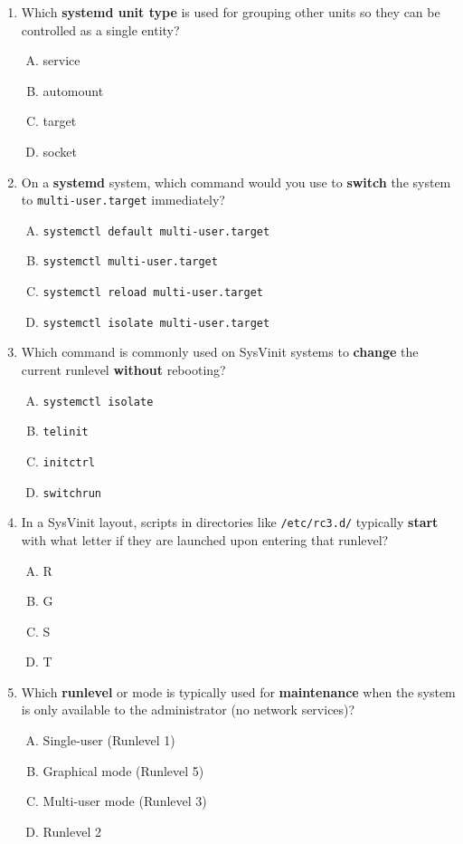 \documentclass[12pt,a4paper]{report}
\begin{document}
\begin{enumerate}[1.]
    \item Which \textbf{systemd unit type} is used for grouping other units so they can be controlled as a single entity?
    \begin{enumerate}[A)]
        \item service
        \item automount
        \item target
        \item socket
    \end{enumerate}
    
    \item On a \textbf{systemd} system, which command would you use to \textbf{switch} the system to \texttt{multi-user.target} immediately?
    \begin{enumerate}[A)]
        \item \texttt{systemctl default multi-user.target}
        \item \texttt{systemctl multi-user.target}
        \item \texttt{systemctl reload multi-user.target}
        \item \texttt{systemctl isolate multi-user.target}
    \end{enumerate}
    
    \item Which command is commonly used on SysVinit systems to \textbf{change} the current runlevel \textbf{without} rebooting?
    \begin{enumerate}[A)]
        \item \texttt{systemctl isolate}
        \item \texttt{telinit}
        \item \texttt{initctrl}
        \item \texttt{switchrun}
    \end{enumerate}
    
    \item In a SysVinit layout, scripts in directories like \texttt{/etc/rc3.d/} typically \textbf{start} with what letter if they are launched upon entering that runlevel?
    \begin{enumerate}[A)]
        \item R
        \item G
        \item S
        \item T
    \end{enumerate}
    
    \item Which \textbf{runlevel} or mode is typically used for \textbf{maintenance} when the system is only available to the administrator (no network services)?
    \begin{enumerate}[A)]
        \item Single-user (Runlevel 1)
        \item Graphical mode (Runlevel 5)
        \item Multi-user mode (Runlevel 3)
        \item Runlevel 2
    \end{enumerate}


\end{enumerate}
\end{document}
